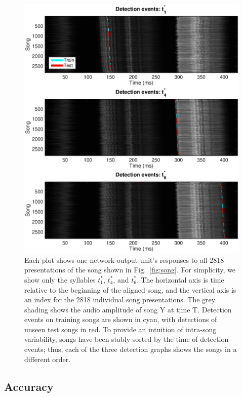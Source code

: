 \documentclass[10pt,letterpaper]{article}
\newcommand\fig[1]{Fig.~\ref{#1}}
\begin{document}
\begin{figure}
  \includegraphics[width=\textwidth]{Fig2}
  \caption{Each plot shows one network output unit's responses to all
    2818 presentations of the song shown in \fig{fig:song}.  For
    simplicity, we show only the syllables $t^*_1$, $t^*_4$, and
    $t^*_6$. The horizontal axis is time relative to the beginning of
    the aligned song, and the vertical axis is an index for the 2818
    individual song presentations. The grey shading shows the audio
    amplitude of song Y at time T. Detection events on training songs
    are shown in cyan, with detections of unseen test songs in red.  To provide an intuition of intra-song variability, songs have been
    stably sorted by the time of detection events; thus, each of the
    three detection graphs shows the songs in a different order.}
  \label{fig:detection_raster}
\end{figure}

\subsection{Accuracy}
\end{document}
